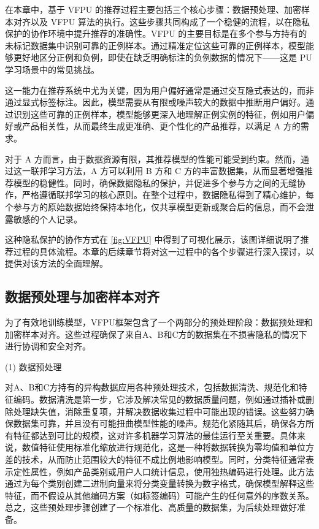 在本章中，基于 VFPU 的推荐过程主要包括三个核心步骤：数据预处理、加密样本对齐以及 VFPU 算法的执行。这些步骤共同构成了一个稳健的流程，以在隐私保护的协作环境中提升推荐的准确性。VFPU 的主要目标是在多个参与方持有的未标记数据集中识别可靠的正例样本。通过精准定位这些可靠的正例样本，模型能够更好地区分正例和负例，即使在缺乏明确标注的负例数据的情况下——这是 PU 学习场景中的常见挑战。

这一能力在推荐系统中尤为关键，因为用户偏好通常是通过交互隐式表达的，而非通过显式标签标注。因此，模型需要从有限或噪声较大的数据中推断用户偏好。通过识别这些可靠的正例样本，模型能够更深入地理解正例实例的特征，例如用户偏好或产品相关性，从而最终生成更准确、更个性化的产品推荐，以满足 A 方的需求。

对于 A 方而言，由于数据资源有限，其推荐模型的性能可能受到约束。然而，通过这一联邦学习方法，A 方可以利用 B 方和 C 方的丰富数据集，从而显著增强推荐模型的稳健性。同时，确保数据隐私的保护，并促进多个参与方之间的无缝协作，严格遵循联邦学习的核心原则。在整个过程中，数据隐私得到了精心维护，每个参与方的原始数据始终保持本地化，仅共享模型更新或聚合后的信息，而不会泄露敏感的个人记录。

这种隐私保护的协作方式在 \autoref{fig:VFPU} 中得到了可视化展示，该图详细说明了推荐过程的具体流程。本章的后续章节将对这一过程中的各个步骤进行深入探讨，以提供对该方法的全面理解。

\subsection{数据预处理与加密样本对齐}
为了有效地训练模型，VFPU框架包含了一个两部分的预处理阶段：数据预处理和加密样本对齐。这些过程确保了来自A、B和C方的数据集在不损害隐私的情况下进行协调和安全对齐。 

(1) 数据预处理 
	
对A、B和C方持有的异构数据应用各种预处理技术，包括数据清洗、规范化和特征编码。数据清洗是第一步，它涉及解决常见的数据质量问题，例如通过插补或删除处理缺失值，消除重复项，并解决数据收集过程中可能出现的错误。这些努力确保数据集可靠，并且没有可能扭曲模型性能的噪声。规范化紧随其后，确保各方所有特征都达到可比的规模，这对许多机器学习算法的最佳运行至关重要。具体来说，数值特征使用标准化缩放进行规范化，这是一种将数据转换为零均值和单位方差的技术，从而防止范围较大的特征不成比例地影响模型。同时，分类特征通常表示定性属性，例如产品类别或用户人口统计信息，使用独热编码进行处理。此方法通过为每个类别创建二进制向量来将分类变量转换为数字格式，确保模型解释这些特征，而不假设从其他编码方案（如标签编码）可能产生的任何意外的序数关系。总之，这些预处理步骤创建了一个标准化、高质量的数据集，为后续处理做好准备。
	
